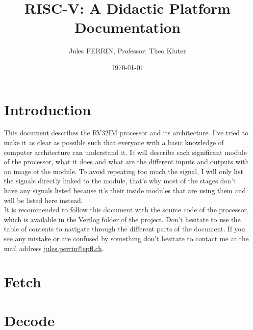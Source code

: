 \documentclass[12pt]{article}
\title{RISC-V: A Didactic Platform \\
\large Documentation}
\author{Jules PERRIN, Professor: Theo Kluter}
\date{\today}
\begin{document}
\maketitle
\tableofcontents

\section{Introduction}
This document describes the RV32IM processor and its architecture. I've tried to make it as clear 
as possible such that everyone with a basic knowledge of computer architecture can understand it.
It will describe each significant module of the processor, what it does and what are the different
inputs and outputs with an image of the module. To avoid repeating too much the signal, I will only list 
the signals directly linked to the module, that's why most of the stages don't have any signals listed because 
it's their inside modules that are using them and will be listed here instead. \\

It is recommended to follow this document with the source code of the processor, which is available
in the Verilog folder of the project.
Don't hesitate to use the table of contents to navigate through the different parts of the document.
If you see any mistake or are confused by something don't hesitate to contact me at the mail address
\href{mailto:jules.perrin@epfl.ch}{jules.perrin@epfl.ch}.

\section{Fetch}




\section{Decode}


\end{document}
